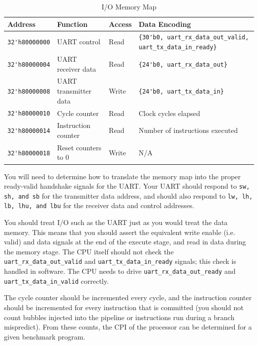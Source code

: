 \documentclass[11pt]{article}
\begin{document}
\begin{table}[hbt]
  \begin{center}
    \caption{I/O Memory Map}
    \label{mem_map1}
    \begin{adjustbox}{width=\columnwidth,center}
    \begin{tabular}{l l l l}
      \toprule
      \textbf{Address} & \textbf{Function} & \textbf{Access} & \textbf{Data Encoding}\\
      \midrule
      \verb|32'h80000000| & UART control & Read & \verb|{30'b0, uart_rx_data_out_valid, uart_tx_data_in_ready}| \\
      \verb|32'h80000004| & UART receiver data & Read & \verb|{24'b0, uart_rx_data_out}| \\
      \verb|32'h80000008| & UART transmitter data & Write & \verb|{24'b0, uart_tx_data_in}| \\
      \midrule
      \verb|32'h80000010| & Cycle counter & Read & Clock cycles elapsed \\
      \verb|32'h80000014| & Instruction counter & Read & Number of instructions executed \\
      \verb|32'h80000018| & Reset counters to 0 & Write & N/A \\
      \bottomrule
    \end{tabular}
    \end{adjustbox}
  \end{center}
\end{table}

You will need to determine how to translate the memory map into the proper ready-valid handshake signals for the UART.
Your UART should respond to \verb|sw, sh, and sb| for the transmitter data address, and should also respond to \verb|lw, lh, lb, lhu, and lbu| for the receiver data and control addresses.

You should treat I/O such as the UART just as you would treat the data memory.
This means that you should assert the equivalent write enable (i.e. valid) and data signals at the end of the execute stage, and read in data during the memory stage.
The CPU itself should not check the \verb|uart_rx_data_out_valid| and \verb|uart_tx_data_in_ready| signals; this check is handled in software.
The CPU needs to drive \verb|uart_rx_data_out_ready| and \verb|uart_tx_data_in_valid| correctly.

The cycle counter should be incremented every cycle, and the instruction counter should be incremented for every instruction that is committed (you should not count bubbles injected into the pipeline or instructions run during a branch mispredict).
From these counts, the CPI of the processor can be determined for a given benchmark program.
\end{document}
